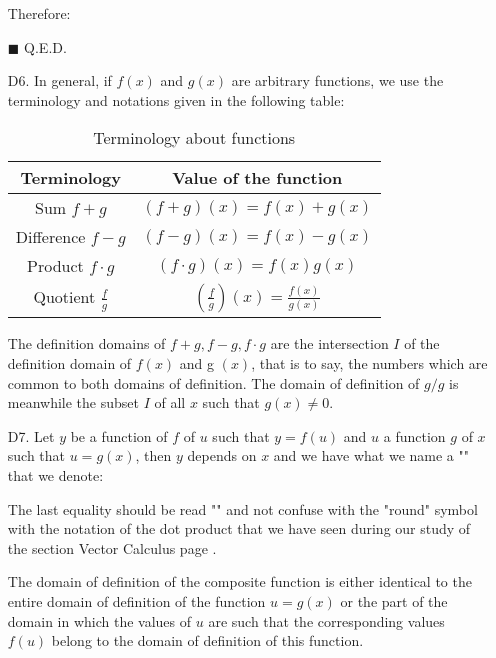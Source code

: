 \begin{enumerate}
\begin{dem}
		Therefore:
		
		\begin{flushright}
			$\blacksquare$  Q.E.D.
		\end{flushright}
		\end{dem}
		\item[D6.] In general, if $f (x)$ and $g (x)$ are arbitrary functions, we use the terminology and notations given in the following table:
		\begin{table}[H]	
			\begin{center}
				\begin{tabular}{|c|c|}
				\hline
				  \rowcolor[gray]{0.75}Terminology&Value of the function\\
				  \hline
				  Sum $f+g$ & $(f+g)(x)=f(x)+g(x)$ \\\hline
				  Difference $f-g$ & $(f-g)(x)=f(x)-g(x)$ \\\hline
				  Product $f \cdot g$ & $(f \cdot g)(x)=f(x)g(x)$ \\\hline
				  Quotient $\displaystyle\frac{f}{g}$&$\left(\displaystyle\frac{f}{g}\right)(x)=\displaystyle\frac{f(x)}{g(x)}$ \\\hline
				\end{tabular}
			\end{center}
			\caption{Terminology about functions}
		\end{table}
		The definition domains of $f+g,f-g,f\cdot g$ are the intersection $I$ of the definition domain of $f (x)$ and g $(x)$, that is to say, the numbers which are common to both domains of definition. The domain of definition of $g/g$ is meanwhile the subset $I$ of all $x$ such that  $g(x)\neq 0$.
		
		\item[D7.] Let $y$ be a function of $f$ of $u$ such that $y=f(u)$ and $u$ a function $g$ of $x$ such that $u=g(x)$, then $y$ depends on $x$ and we have what we name a "\label{composite function}" that we denote:
		
		The last equality should be read "" and not confuse with the "round" symbol with the notation of the dot product that we have seen during our study of the section Vector Calculus page \pageref{dot product}.
		
		The domain of definition of the composite function is either identical to the entire domain of definition of the function $u=g(x)$ or the part of the domain in which the values of $u$ are such that the corresponding values $f (u)$ belong to the domain of definition of this function.
		

\end{enumerate}
